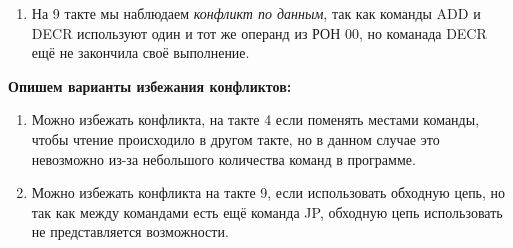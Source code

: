 \documentclass[a4paper,14pt]{extarticle}
\begin{document}
\begin{problem}
\begin{enumerate}
	\item На 9 такте мы наблюдаем\textit{ конфликт по данным}, так как команды ADD и DECR используют один и тот же операнд из РОН 00, но команада DECR ещё не закончила своё выполнение.

	
\end{enumerate}

\textbf{Опишем варианты избежания конфликтов:}
\begin{enumerate}
	\item Можно избежать конфликта, на такте 4 если поменять местами команды, чтобы чтение происходило в другом такте, но в данном случае это невозможно из-за небольшого количества команд в программе.
	
	\item Можно избежать конфликта на такте 9, если использовать обходную цепь, но так как между командами есть ещё команда JP, обходную цепь использовать не представляется возможности.
\end{enumerate}


\end{problem}
\end{document}

